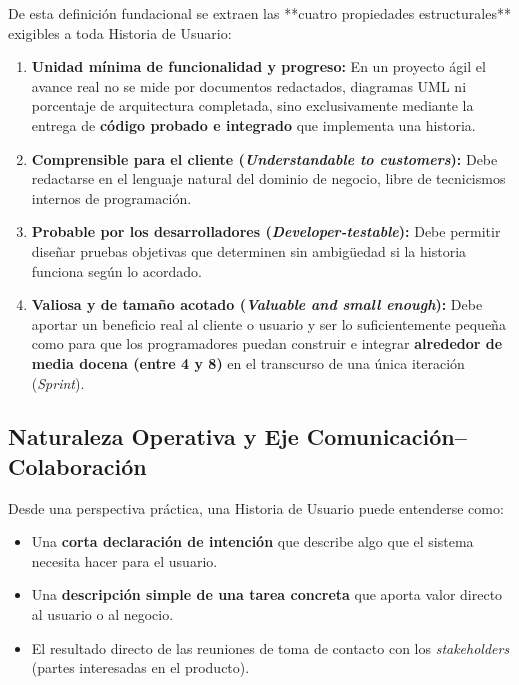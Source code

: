 De esta definición fundacional se extraen las **cuatro propiedades estructurales** exigibles a toda Historia de Usuario:
\begin{enumerate}[label=\textbf{\arabic*.}, itemsep=4pt]
    \item \textbf{Unidad mínima de funcionalidad y progreso:} En un proyecto ágil el avance real no se mide por documentos redactados, diagramas UML ni porcentaje de arquitectura completada, sino exclusivamente mediante la entrega de \textbf{código probado e integrado} que implementa una historia.
    \item \textbf{Comprensible para el cliente (\textit{Understandable to customers}):} Debe redactarse en el lenguaje natural del dominio de negocio, libre de tecnicismos internos de programación.
    \item \textbf{Probable por los desarrolladores (\textit{Developer-testable}):} Debe permitir diseñar pruebas objetivas que determinen sin ambigüedad si la historia funciona según lo acordado.
    \item \textbf{Valiosa y de tamaño acotado (\textit{Valuable and small enough}):} Debe aportar un beneficio real al cliente o usuario y ser lo suficientemente pequeña como para que los programadores puedan construir e integrar \textbf{alrededor de media docena (entre 4 y 8)} en el transcurso de una única iteración (\textit{Sprint}).
\end{enumerate}

\subsection{Naturaleza Operativa y Eje Comunicación--Colaboración}

Desde una perspectiva práctica, una Historia de Usuario puede entenderse como:
\begin{itemize}[itemsep=3pt]
    \item Una \textbf{corta declaración de intención} que describe algo que el sistema necesita hacer para el usuario.
    \item Una \textbf{descripción simple de una tarea concreta} que aporta valor directo al usuario o al negocio.
    \item El resultado directo de las reuniones de toma de contacto con los \textit{stakeholders} (partes interesadas en el producto).
\end{itemize}

